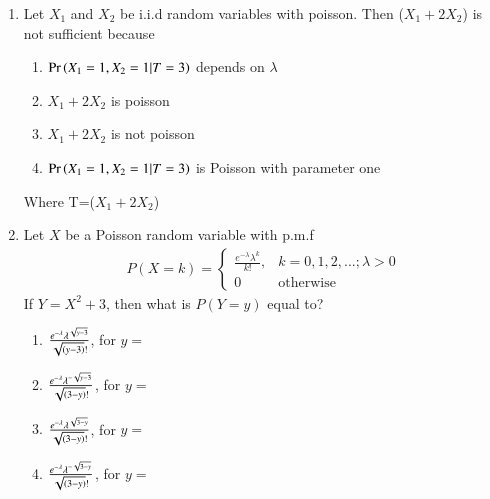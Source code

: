 \renewcommand{\theequation}{\theenumi}
\renewcommand{\thefigure}{\theenumi}
\renewcommand{\thetable}{\theenumi}
\begin{enumerate}[label=\thesection.\arabic*.,ref=\thesection.\theenumi]

\item Let $X_{1}$ and  $X_{2}$ be i.i.d random variables with poisson. Then ($X_{1}+2X_{2}$) is not sufficient because
\begin{enumerate}
    \item{$\Pr\left(X_{1}=1,X_{2}=1 |T=3\right)$ depends on $\lambda$}\\
    \item{$X_{1}+2X_{2}$ is poisson}\\
     \item{$X_{1}+2X_{2}$ is not poisson}\\
      \item{$\Pr\left(X_{1}=1,X_{2}=1 | T=3\right)$ is Poisson with parameter one}\\
\end{enumerate}
Where T=($X_{1}+2X_{2}$)
\solution
%

\item Let $X$ be a Poisson random variable with p.m.f
\begin{align}
\label{poisson/1/eq:1}
P(X=k) = 
    \begin{cases} 
      \frac{e^{-\lambda}\lambda^{k}}{k!},& k=0,1,2,...;  \lambda > 0\\
      0 & \text{otherwise}
   \end{cases}
\end{align}
If $Y = X^2 + 3$, then what is $P(Y=y)$ equal to?
\begin{enumerate}[label={(\Alph*)}]
    \item $\frac{e^{-\lambda}\lambda^{\sqrt{y-3}}}{\sqrt{\left(y-3\right)}!}$, for $y =$ 
    \item $\frac{e^{-\lambda}\lambda^{-\sqrt{y-3}}}{\sqrt{\left(3-y\right)}!}$, for $y =$ 
    \item $\frac{e^{-\lambda}\lambda^{\sqrt{3-y}}}{\sqrt{\left(3-y\right)}!}$, for $y =$ 
    \item $\frac{e^{-\lambda}\lambda^{-\sqrt{3-y}}}{\sqrt{\left(3-y\right)}!}$, for $y =$ 
\end{enumerate}
%
\solution



\end{enumerate}
